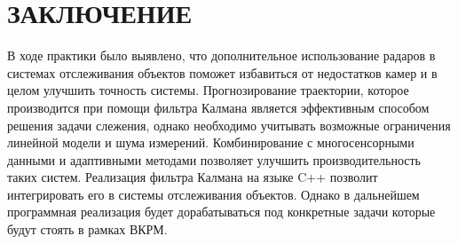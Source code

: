 \chapter*{ЗАКЛЮЧЕНИЕ}

В ходе практики было выявлено, что дополнительное использование радаров в системах
отслеживания объектов поможет избавиться от недостатков камер и в целом улучшить 
точность системы. Прогнозирование траектории, которое производится при помощи 
фильтра Калмана является эффективным способом решения задачи слежения, однако 
необходимо учитывать возможные ограничения линейной модели и шума измерений.
Комбинирование с многосенсорными данными и адаптивными методами позволяет
улучшить производительность таких систем. Реализация фильтра Калмана на языке C++
позволит интегрировать его в системы отслеживания объектов. Однако в дальнейшем
программная реализация будет дорабатываться под конкретные задачи которые будут
стоять в рамках ВКРМ.